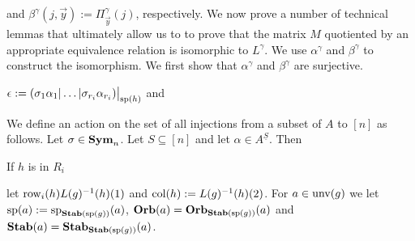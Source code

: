 \documentclass[../main/thesis.tex]{subfiles}
\begin{document}
\pagebreak




and $\beta^{\gamma} (j, \vec{y}) := \Pi^{\gamma}_{\vec{y}}(j)$, respectively. We
now prove a number of technical lemmas that ultimately allow us to to prove that
the matrix $M$ quotiented by an appropriate equivalence relation is isomorphic
to $L^{\gamma}$. We use $\alpha^{\gamma}$ and $\beta^{\gamma}$ to construct the
isomorphism. We first show that $\alpha^{\gamma}$ and $\beta^{\gamma}$ are
surjective.




$\epsilon := \restr{(\sigma_1 \alpha_1 \vert \ldots \vert \sigma_{r_i}
  \alpha_{r_i})}{\consp(h)}$ and













We define an action on the set of all injections from a subset of $A$ to $[n]$
as follows. Let $\sigma \in \text{\textbf{Sym}}_n$. Let $S \subseteq [n]$ and let $\alpha \in
A^{\underline{S}}$. Then

If $h$ is in $R_i$


let $\text{row}_i(h)L(g)^{-1}(h)(1)$ and $\text{col}(h) := L(g)^{-1}(h)(2)$. For $a \in
\text{unv}(g)$ we let $\text{sp}(a) := \text{sp}_{\text{\textbf{Stab}} (\text{sp} (g))}(a)$, $\text{\textbf{Orb}}(a) =
\text{\textbf{Orb}}_{\text{\textbf{Stab}} (\text{sp} (g))}(a)$ and $\text{\textbf{Stab}}(a) = \text{\textbf{Stab}}_{\text{\textbf{Stab}} (\text{sp} (g))}(a)$.
\end{document}

